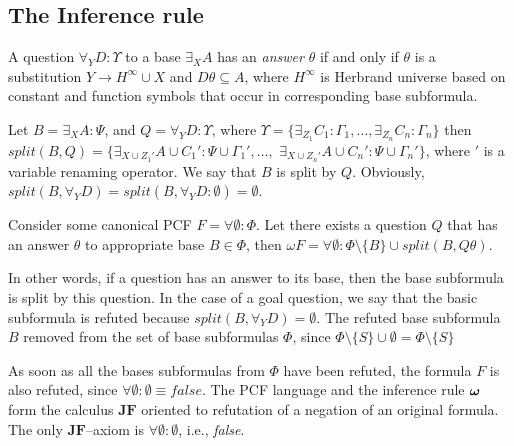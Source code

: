 \documentclass[runningheads,a4paper]{llncs}
\begin{document}
\subsection{The Inference rule}

\begin{definition}[Answer]
\label{answer}
A question $\forall_YD:\Upsilon$ to a base $\exists_XA$ has an {\em answer} $\theta$ if and only if $\theta$ is a substitution $Y \rightarrow H^{\infty} \cup X$ and $D\theta \subseteq A$, where $H^{\infty}$ is Herbrand universe based on constant and function symbols that occur in corresponding base subformula.
\end{definition}

\begin{definition}[Splitting]
\label{splitting}
Let $B = \exists_XA\colon\Psi$, and $Q = \forall_YD\colon\Upsilon$, where $\Upsilon = \{\exists_{Z_1}C_1\colon\Gamma_1,\ldots, \exists_{Z_n}C_n\colon\Gamma_n\}$ then $split(B,Q) = \{\exists_{X \cup {Z_1}'} A \cup {C_1}'\colon\Psi \cup {\Gamma_1}',\ldots,$ $\exists_{X \cup {Z_n}'} A \cup {C_n}'\colon\Psi \cup {\Gamma_n}'\}$, where $'$ is a variable renaming operator. We say that $B$ is split by $Q$. Obviously, $split(B,\forall_YD) = split(B,\forall_YD\colon\emptyset) = \emptyset$.
\end{definition}

\begin{definition}
Consider some canonical PCF $F = \forall\emptyset\colon\Phi$. Let there exists a question $Q$ that has an answer $\theta$ to appropriate base $B \in \Phi$, then $\omega F  = \forall \emptyset\colon\Phi \setminus \{B\} \cup split(B,Q\theta)$.
\end{definition}

In other words, if a question has an answer to its base, then the base subformula is split by this question.  In the case of a goal question, we say that the basic subformula is refuted because $split(B,\forall_YD) = \emptyset$. The refuted base subformula $B$ removed from the set of base subformulas $\Phi$, since $\Phi \setminus \{S\} \cup \emptyset = \Phi \setminus \{S\}$

As soon as all the bases subformulas from $\Phi$ have been refuted, the formula $F$ is also refuted, since $\forall \emptyset\colon\emptyset \equiv false$.  The PCF language and the inference rule $\boldsymbol{\omega}$ form the calculus $\boldsymbol{JF}$ oriented to refutation of a negation of an original formula.  The only $\boldsymbol{JF}$--axiom is $\forall \emptyset\colon\emptyset$, i.e., \emph{false}.
\end{document}

